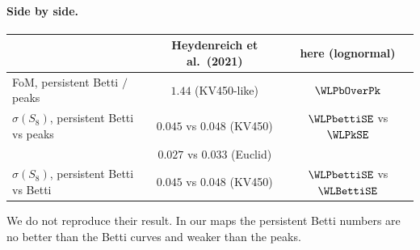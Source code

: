 \paragraph{Side by side.}
\begin{center}
\small
\begin{tabular}{@{}lcc@{}}
\toprule
 & Heydenreich et al.\ (2021) & here (lognormal)\\\midrule
FoM, persistent Betti $/$ peaks & $1.44$ (KV450-like) & $\WLPbOverPk$\\
$\sigma(S_8)$, persistent Betti vs peaks & $0.045$ vs $0.048$ (KV450) & $\WLPbettiSE$ vs $\WLPkSE$\\
 & $0.027$ vs $0.033$ (Euclid) & \\
$\sigma(S_8)$, persistent Betti vs Betti & $0.045$ vs $0.048$ (KV450) & $\WLPbettiSE$ vs $\WLBettiSE$\\
\bottomrule
\end{tabular}
\end{center}
We do not reproduce their result. In our maps the persistent Betti numbers are no better than the Betti curves and
weaker than the peaks.

